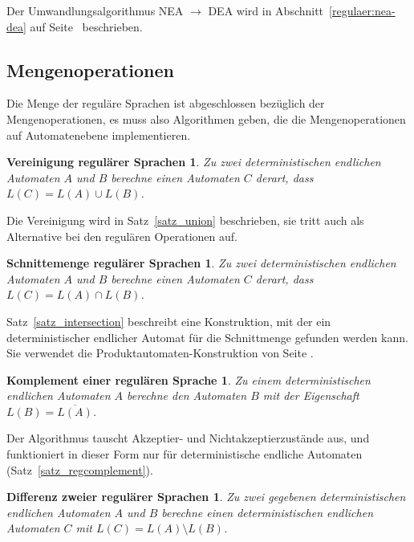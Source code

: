 Der Umwandlungsalgorithmus NEA $\to$ DEA wird in
Abschnitt~\ref{regulaer:nea-dea}
auf
Seite~\pageref{regulaer:nea-dea}
beschrieben.

\subsection{Mengenoperationen}
Die Menge der reguläre Sprachen ist abgeschlossen bezüglich der
Mengenoperationen, es muss also Algorithmen geben, die die Mengenoperationen
auf Automatenebene implementieren.

\newtheorem*{RegVereinigung}{Vereinigung regulärer Sprachen}
\begin{RegVereinigung}
Zu zwei deterministischen endlichen Automaten $A$ und $B$ berechne einen
Automaten $C$ derart, dass $L(C)=L(A)\cup L(B)$.
\end{RegVereinigung}

Die Vereinigung wird in Satz~\ref{satz_union} beschrieben, sie tritt auch als
Alternative bei den regulären Operationen auf.

\newtheorem*{RegSchnitt}{Schnittemenge regulärer Sprachen}
\begin{RegSchnitt}
Zu zwei deterministischen endlichen Automaten $A$ und $B$ berechne einen
Automaten $C$ derart, dass $L(C)=L(A)\cap L(B)$.
\end{RegSchnitt}

Satz~\ref{satz_intersection} beschreibt eine Konstruktion, mit der
ein deterministischer endlicher Automat für die Schnittmenge gefunden
werden kann. Sie verwendet die Produktautomaten-Konstruktion von Seite
\pageref{reg_produktautomat}.

\newtheorem*{RegNegation}{Komplement einer regulären Sprache}
\begin{RegNegation}
Zu einem deterministischen endlichen Automaten $A$ berechne den Automaten
$B$ mit der Eigenschaft $L(B)=\overline{L(A)}$.
\end{RegNegation}

Der Algorithmus tauscht Akzeptier- und Nichtakzeptierzustände aus,
und funktioniert in dieser Form nur für deterministische endliche
Automaten (Satz~\ref{satz_regcomplement}).

\newtheorem*{RegDifferenz}{Differenz zweier regulärer Sprachen}
\begin{RegDifferenz}
Zu zwei gegebenen deterministischen endlichen Automaten $A$ und $B$ 
berechne einen deterministischen endlichen Automaten $C$ mit
$L(C)=L(A)\setminus L(B)$.
\end{RegDifferenz}

